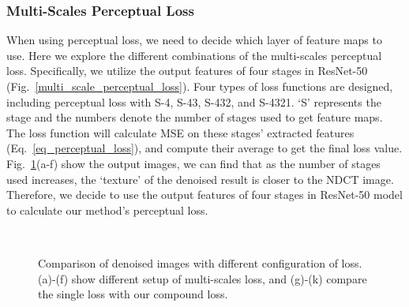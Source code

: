 \documentclass[conference]{IEEEtran}
\begin{document}
            \medskip
            
            \subsubsection{Multi-Scales Perceptual Loss}
                When using perceptual loss, we need to decide which layer of feature maps to use.
                Here we explore the different combinations of the multi-scales perceptual loss.
                Specifically, we utilize the output features of four stages in ResNet-50 (Fig.~\ref{multi_scale_perceptual_loss}).
                Four types of loss functions are designed, including perceptual loss with S-4, S-43, S-432, and S-4321.
                `S' represents the stage and the numbers denote the number of stages used to get feature maps.
                The loss function will calculate MSE on these stages' extracted features (Eq.~\ref{eq_perceptual_loss}), and compute their average to get the final loss value. 
                Fig.~\ref{loss_comparison}(a-f) show the output images, we can find that as the number of stages used increases, the `texture' of the denoised result is closer to the NDCT image.
                Therefore, we decide to use the output features of four stages in ResNet-50 model to calculate our method's perceptual loss.

                \begin{figure}[t]
                    \\
                    \caption{Comparison of denoised images with different configuration of loss. (a)-(f) show different setup of multi-scales loss, and (g)-(k) compare the single loss with our compound loss.}
                    \label{loss_comparison}
                \end{figure}
\end{document}
